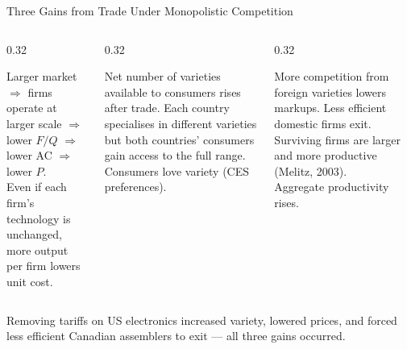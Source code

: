 \documentclass[aspectratio=169]{beamer}
\begin{document}
\begin{frame}{Three Gains from Trade Under Monopolistic Competition}
\begin{columns}
\begin{column}{0.32\textwidth}
\begin{tcolorbox}[colback=UNBCDark!8,colframe=UNBCDark,title={\small\bfseries 1. Lower Prices},arc=2mm,left=1.5mm,right=1.5mm,top=0.8mm,bottom=0.8mm]
\small Larger market $\Rightarrow$ firms operate at larger scale $\Rightarrow$ lower $F/Q$ $\Rightarrow$ lower AC $\Rightarrow$ lower $P$.\\[0.3em]
Even if each firm's technology is unchanged, more output per firm lowers unit cost.
\end{tcolorbox}
\end{column}
\begin{column}{0.32\textwidth}
\begin{tcolorbox}[colback=AccentTeal!8,colframe=AccentTeal,title={\small\bfseries 2. More Variety},arc=2mm,left=1.5mm,right=1.5mm,top=0.8mm,bottom=0.8mm]
\small Net number of varieties available to consumers rises after trade. Each country specialises in different varieties but both countries' consumers gain access to the full range.\\[0.3em]
Consumers love variety (CES preferences).
\end{tcolorbox}
\end{column}
\begin{column}{0.32\textwidth}
\begin{tcolorbox}[colback=AccentBlue!8,colframe=AccentBlue,title={\small\bfseries 3. Pro-Competitive},arc=2mm,left=1.5mm,right=1.5mm,top=0.8mm,bottom=0.8mm]
\small More competition from foreign varieties lowers markups. Less efficient domestic firms exit. Surviving firms are larger and more productive (Melitz, 2003).\\[0.3em]
Aggregate productivity rises.
\end{tcolorbox}
\end{column}
\end{columns}
\vspace{0.3em}
\begin{canadex}
  Removing tariffs on US electronics increased variety, lowered prices, and forced less efficient Canadian assemblers to exit --- all three gains occurred.
\end{canadex}
\end{frame}
\end{document}
